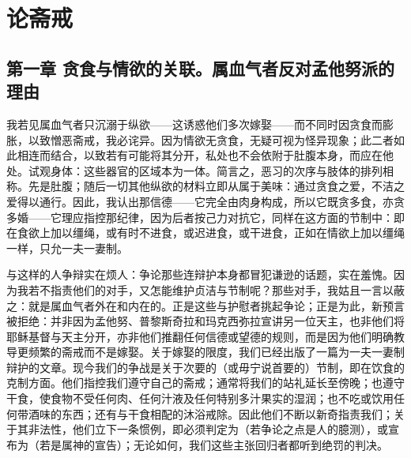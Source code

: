 
\chapter{论斋戒}


\par


\section{第一章 贪食与情欲的关联。属血气者反对孟他努派的理由}

我若见属血气者只沉溺于纵欲——这诱惑他们多次嫁娶——而不同时因贪食而膨胀，以致憎恶斋戒，我必诧异。因为情欲无贪食，无疑可视为怪异现象；此二者如此相连而结合，以致若有可能将其分开，私处也不会依附于肚腹本身，而应在他处。试观身体：这些器官的区域本为一体。简言之，恶习的次序与肢体的排列相称。先是肚腹；随后一切其他纵欲的材料立即从属于美味：通过贪食之爱，不洁之爱得以通行。因此，我认出那信德——它完全由肉身构成，所以它既贪多食，亦贪多婚——它理应指控那纪律，因为后者按己力对抗它，同样在这方面的节制中：即在食欲上加以缰绳，或有时不进食，或迟进食，或干进食，正如在情欲上加以缰绳一样，只允一夫一妻制。\par

与这样的人争辩实在烦人：争论那些连辩护本身都冒犯谦逊的话题，实在羞愧。因为我若不指责他们的对手，又怎能维护贞洁与节制呢？那些对手，我姑且一言以蔽之：就是属血气者外在和内在的。正是这些与护慰者挑起争论；正是为此，新预言被拒绝：并非因为孟他努、普黎斯奇拉和玛克西弥拉宣讲另一位天主，也非他们将耶稣基督与天主分开，亦非他们推翻任何信德或望德的规则，而是因为他们明确教导更频繁的斋戒而不是嫁娶。关于嫁娶的限度，我们已经出版了一篇为一夫一妻制辩护的文章。现今我们的争战是关于次要的（或毋宁说首要的）节制，即在饮食的克制方面。他们指控我们遵守自己的斋戒；通常将我们的站礼延长至傍晚；也遵守干食，使食物不受任何肉、任何汁液及任何特别多汁果实的湿润；也不吃或饮用任何带酒味的东西；还有与干食相配的沐浴戒除。因此他们不断以新奇指责我们；关于其非法性，他们立下一条惯例，即必须判定为（若争论之点是人的臆测），或宣布为（若是属神的宣告）；无论如何，我们这些主张回归者都听到绝罚的判决。\par

